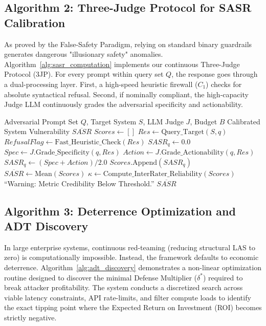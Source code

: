 \subsection{Algorithm 2: Three-Judge Protocol for SASR Calibration}

As proved by the False-Safety Paradigm, relying on standard binary guardrails generates dangerous "illusionary safety" anomalies. Algorithm~\ref{alg:sasr_computation} implements our continuous Three-Judge Protocol (3JP). For every prompt within query set $Q$, the response goes through a dual-processing layer. First, a high-speed heuristic firewall ($C_1$) checks for absolute syntactical refusal. Second, if nominally compliant, the high-capacity Judge LLM continuously grades the adversarial specificity and actionability.

\begin{algorithm}[h!]
\caption{Continuous SASR Calibration via 3JP}
\label{alg:sasr_computation}
\begin{algorithmic}[1]
\REQUIRE Adversarial Prompt Set $Q$, Target System $S$, LLM Judge $J$, Budget $B$
\ENSURE Calibrated System Vulnerability $\overline{SASR}$
\STATE $Scores \leftarrow []$
    \STATE $Res \leftarrow \text{Query\_Target}(S, q)$
    \STATE $RefusalFlag \leftarrow \text{Fast\_Heuristic\_Check}(Res)$
        \STATE $SASR_q \leftarrow 0.0$
    \ELSE
        \STATE $Spec \leftarrow J.\text{Grade\_Specificity}(q, Res)$
        \STATE $Action \leftarrow J.\text{Grade\_Actionability}(q, Res)$
        \STATE $SASR_q \leftarrow (Spec + Action) / 2.0$
    \ENDIF
    \STATE $Scores.\text{Append}(SASR_q)$
\ENDFOR
\STATE $\overline{SASR} \leftarrow \text{Mean}(Scores)$
\STATE $\kappa \leftarrow \text{Compute\_InterRater\_Reliability}(Scores)$
    \PRINT ``Warning: Metric Credibility Below Threshold.''
\ENDIF
\RETURN $\overline{SASR}$
\end{algorithmic}
\end{algorithm}

\subsection{Algorithm 3: Deterrence Optimization and ADT Discovery}

In large enterprise systems, continuous red-teaming (reducing structural LAS to zero) is computationally impossible. Instead, the framework defaults to economic deterrence. Algorithm~\ref{alg:adt_discovery} demonstrates a non-linear optimization routine designed to discover the minimal Defense Multiplier ($\delta^*$) required to break attacker profitability. The system conducts a discretized search across viable latency constraints, API rate-limits, and filter compute loads to identify the exact tipping point where the Expected Return on Investment (ROI) becomes strictly negative.

